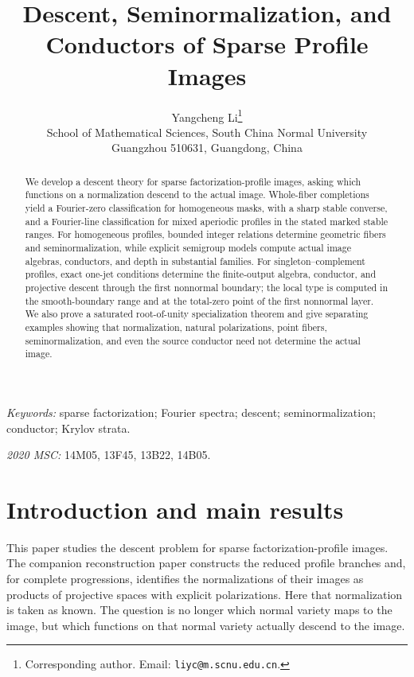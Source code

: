 \documentclass[10pt,fleqn]{article}
\numberwithin{equation}{section}
\begin{document}
\title{Descent, Seminormalization, and Conductors of Sparse Profile Images}
\author{Yangcheng Li\thanks{Corresponding author. Email: \texttt{liyc@m.scnu.edu.cn}.}\\[3pt]
\small School of Mathematical Sciences, South China Normal University\\
\small Guangzhou 510631, Guangdong, China}
\date{}
\maketitle
\begin{abstract}
We develop a descent theory for sparse factorization-profile images, asking
which functions on a normalization descend to the actual image. Whole-fiber
completions yield a Fourier-zero
classification for homogeneous masks, with a sharp stable converse, and a
Fourier-line classification for mixed aperiodic profiles in the stated marked
stable ranges. For homogeneous profiles, bounded integer relations determine
geometric fibers and seminormalization, while explicit semigroup models compute
actual image algebras, conductors, and depth in substantial families. For
singleton--complement profiles, exact one-jet conditions determine the
finite-output algebra, conductor, and projective descent through the first
nonnormal boundary; the local type is computed in the smooth-boundary range and
at the total-zero point of the first nonnormal layer. We also prove a saturated
root-of-unity specialization theorem and give separating examples showing that
normalization, natural polarizations, point fibers, seminormalization, and even
the source conductor need not determine the actual image.
\end{abstract}
\noindent\textit{Keywords:} sparse factorization; Fourier spectra; descent;
seminormalization; conductor; Krylov strata.

\noindent\textit{2020 MSC:} 14M05, 13F45, 13B22, 14B05.
\section{Introduction and main results}\label{sec:introduction}

This paper studies the descent problem for sparse factorization-profile
images.  The companion reconstruction paper \cite{LiProfileGeometry}
constructs the reduced profile branches and, for complete progressions,
identifies the normalizations of their images as products of projective
spaces with explicit polarizations.  Here that normalization is taken as
known.  The question is no longer which normal variety maps to the image, but
which functions on that normal variety actually descend to the image.
\end{document}
